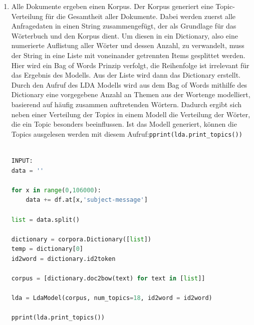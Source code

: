 \documentclass[german,version-2020-11]{uzl-thesis}
\begin{document}
\begin{enumerate}
\item
Alle Dokumente ergeben einen Korpus. Der Korpus generiert eine Topic-Verteilung für die Gesamtheit aller Dokumente. Dabei werden zuerst alle Anfragedaten in einen String zusammengefügt, der als Grundlage für das Wörterbuch und den Korpus dient. Um diesen in ein Dictionary, also eine numerierte Auflistung aller Wörter und dessen Anzahl, zu verwandelt, muss der String in eine Liste mit voneinander getrennten Items gesplittet werden. Hier wird ein Bag of Words Prinzip verfolgt, die Reihenfolge ist irrelevant für das Ergebnis des Modells. Aus der Liste wird dann das Dictionary erstellt. Durch den Aufruf des LDA Modells wird aus dem Bag of Words mithilfe des Dictionary eine vorgegebene Anzahl an Themen aus der Wortenge modelliert, basierend auf häufig zusammen auftretenden Wörtern. Dadurch ergibt sich neben einer Verteilung der Topics in einem Modell die Verteilung der Wörter, die ein Topic besonders beeinflussen. Ist das Modell generiert, können die Topics ausgelesen werden mit diesem Aufruf:\lstinline{pprint(lda.print_topics())}\\
\\

\begin{lstlisting}[language=Python, basicstyle=\small]
INPUT:
data = ''

for x in range(0,106000):
    data += df.at[x,'subject-message']

list = data.split()

dictionary = corpora.Dictionary([list])
temp = dictionary[0]
id2word = dictionary.id2token

corpus = [dictionary.doc2bow(text) for text in [list]]

lda = LdaModel(corpus, num_topics=18, id2word = id2word)

pprint(lda.print_topics())


\end{lstlisting}
\end{enumerate}
\end{document}
